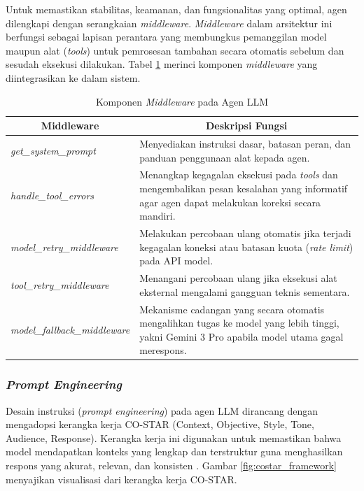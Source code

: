 Untuk memastikan stabilitas, keamanan, dan fungsionalitas yang optimal, agen dilengkapi dengan serangkaian \textit{middleware}. \textit{Middleware} dalam arsitektur ini berfungsi sebagai lapisan perantara yang membungkus pemanggilan model maupun alat (\textit{tools}) untuk pemrosesan tambahan secara otomatis sebelum dan sesudah eksekusi dilakukan. Tabel \ref{tab:middleware_components} merinci komponen \textit{middleware} yang diintegrasikan ke dalam sistem.

\begin{table}[H]
    \centering
    \caption{Komponen \textit{Middleware} pada Agen LLM}
    \label{tab:middleware_components}
    \small
    \begin{tabular}{|l|p{7cm}|}
    \hline
    \multicolumn{1}{|c|}{\textbf{Middleware}} & \multicolumn{1}{c|}{\textbf{Deskripsi Fungsi}} \\ \hline
    \textit{get\_system\_prompt} & Menyediakan instruksi dasar, batasan peran, dan panduan penggunaan alat kepada agen. \\ \hline
    \textit{handle\_tool\_errors} & Menangkap kegagalan eksekusi pada \textit{tools} dan mengembalikan pesan kesalahan yang informatif agar agen dapat melakukan koreksi secara mandiri. \\ \hline
    \textit{model\_retry\_middleware} & Melakukan percobaan ulang otomatis jika terjadi kegagalan koneksi atau batasan kuota (\textit{rate limit}) pada API model. \\ \hline
    \textit{tool\_retry\_middleware} & Menangani percobaan ulang jika eksekusi alat eksternal mengalami gangguan teknis sementara. \\ \hline
    \textit{model\_fallback\_middleware} & Mekanisme cadangan yang secara otomatis mengalihkan tugas ke model yang lebih tinggi, yakni Gemini 3 Pro apabila model utama gagal merespons. \\ \hline
    \end{tabular}
\end{table}

\subsubsection{\textit{Prompt Engineering}}
Desain instruksi (\textit{prompt engineering}) pada agen LLM dirancang dengan mengadopsi kerangka kerja CO-STAR (Context, Objective, Style, Tone, Audience, Response). Kerangka kerja ini digunakan untuk memastikan bahwa model mendapatkan konteks yang lengkap dan terstruktur guna menghasilkan respons yang akurat, relevan, dan konsisten \parencite{govtechsingaporeCOSTARPromptEngineering2024}. Gambar \ref{fig:costar_framework} menyajikan visualisasi dari kerangka kerja CO-STAR.

